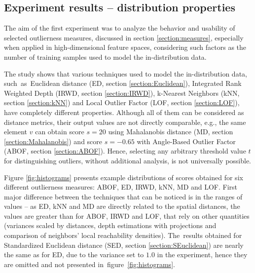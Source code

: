 \subsection{Experiment results – distribution properties}
\label{section:distributions-results-properties}

The aim of the first experiment was to analyze the behavior and usability of selected outlierness measures, discussed in section \ref{section:measures}, especially when applied in high-dimensional feature spaces, considering such factors as the number of training samples used to model the in-distribution data.

The study shows that various techniques used to model the in-distribution data, such~as~Euclidean distance (ED, section \ref{section:Euclidean}), Integrated Rank Weighted Depth (IRWD, section \ref{section:IRWD}), k-Nearest Neighbors (kNN, section \ref{section:kNN}) and Local Outlier Factor (LOF, section \ref{section:LOF}), have completely different properties. Although all of them can be considered as distance metrics, their output values are not directly comparable, e.g., the same element $v$ can obtain score $s=20$ using Mahalanobis distance (MD, section \ref{section:Mahalanobis}) and score $s=-0.65$ with Angle-Based Outlier Factor (ABOF, section \ref{section:ABOF}). Hence, selecting any arbitrary threshold value $t$ for distinguishing outliers, without additional analysis, is not universally possible.

Figure \ref{fig:histograms} presents example distributions of scores obtained for six different outlierness measures: ABOF, ED, IRWD, kNN, MD and LOF. First major difference between the techniques that can be noticed is in the ranges of values – as ED, kNN and MD are directly related to the spatial distances, the values are greater than for ABOF, IRWD and LOF, that rely on other quantities (variances scaled by distances, depth estimations with projections and comparison of neighbors' local reachability densities). The~results obtained for Standardized Euclidean distance (SED, section \ref{section:SEuclidean}) are nearly the same as for ED, due to the variance set to $1.0$ in the experiment, hence they are omitted and not presented in~figure~\ref{fig:histograms}.

